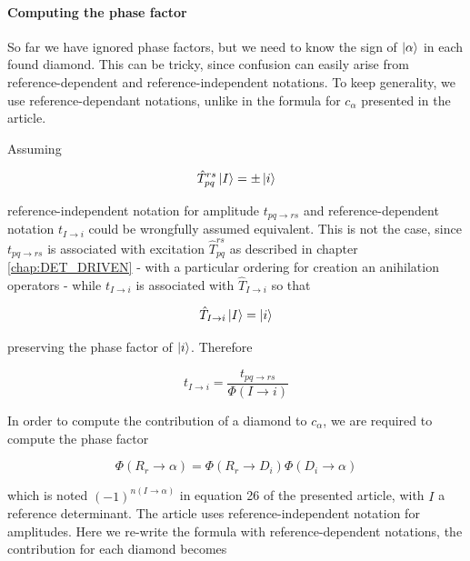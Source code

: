 \documentclass[./thesis.tex]{subfiles}
\begin{document}
\paragraph{Computing the phase factor}



So far we have ignored phase factors, but we need to know the sign of ${\ket{\alpha}}$ in each found diamond. This can be tricky, since confusion can easily arise from reference-dependent and reference-independent notations. To keep generality, we use reference-dependant notations, unlike in the formula for $c_\alpha$ presented in the article.

Assuming

\begin{equation}
\hat T_{pq}^{rs} \ket I = \pm \ket i
\end{equation}

reference-independent notation for amplitude $t_{pq \rightarrow rs}$ and reference-dependent notation $t_{I \rightarrow i}$ could be wrongfully assumed equivalent. This is not the case, since $t_{pq \rightarrow rs}$ is associated with excitation $\hat T_{pq}^{rs}$ as described in chapter \ref{chap:DET_DRIVEN} - with a particular ordering for creation an anihilation operators - while $t_{I \rightarrow i}$ is associated with $\hat T_{I \rightarrow i}$ so that

\begin{equation}
\hat T_{I \rightarrow i}  \ket I = \ket i
\end{equation}

preserving the phase factor of $\ket i$. Therefore


\begin{equation}
t_{I \rightarrow i} = \frac{t_{pq \rightarrow rs}}{\Phi(I \rightarrow i)}
\end{equation}

In order to compute the contribution of a diamond to $c_\alpha$, we are required to compute the phase factor

\begin{equation}
\Phi(R _r \rightarrow \alpha) = \Phi(R _r \rightarrow D_i) \Phi(D_i \rightarrow \alpha)
\end{equation}



which is noted $(-1)^{n(I \rightarrow \alpha)}$ in equation 26 of the presented article, with $I$ a reference determinant. The article uses reference-independent notation for amplitudes. Here we re-write the formula with reference-dependent notations, the contribution for each diamond becomes
\end{document}
